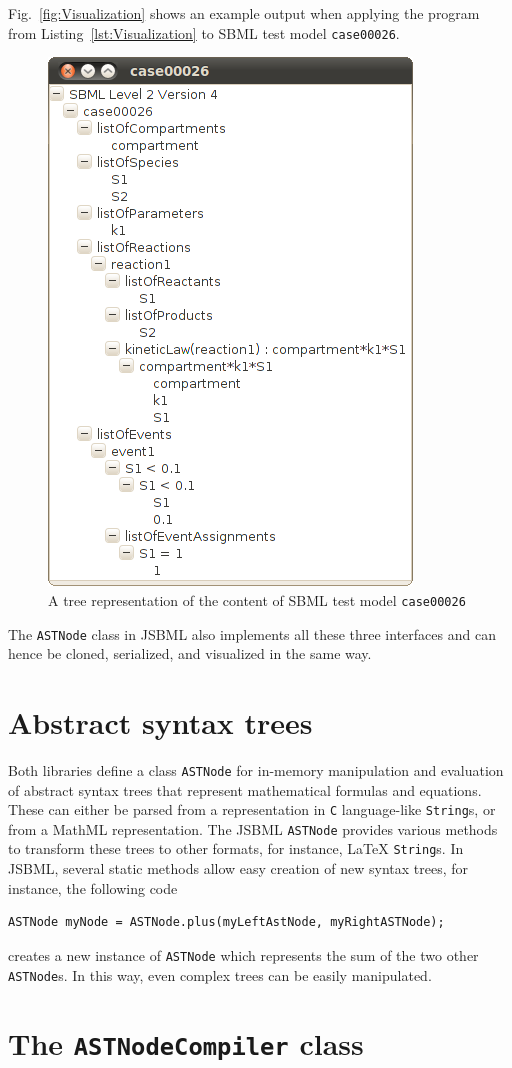 \documentclass[
  letterpaper,
  11pt,
  headsepline,
  pointlessnumbers,
  tablecaptionabove,
  headinclude,
  appendixprefix,
  idxtotoc,
  bibtotoc,
  titlepage
]{scrartcl}
\begin{document}
Fig.~\vref{fig:Visualization} shows an example output when applying the program from 
Listing~\vref{lst:Visualization} to SBML test model \texttt{case00026}.
\begin{figure}
\includegraphics[width=.35\textwidth]{posters/2010_ICSB_and_COMBINE/JSBMLvisualizerTransparent}
\caption[Tree representation of an SBML file]{A tree representation of the content of SBML test model \texttt{case00026}}
\label{fig:Visualization}
\end{figure}
The \verb!ASTNode! class in JSBML also implements all these three interfaces and can hence
be cloned, serialized, and visualized in the same way.


\section{Abstract syntax trees}

Both libraries define a class \verb!ASTNode! for in-memory manipulation and evaluation
of abstract syntax trees that represent mathematical formulas and equations. These
can either be parsed from a representation in \verb!C! language-like \verb!String!s,
or from a MathML representation. The JSBML \verb!ASTNode! provides various methods
to transform these trees to other formats, for instance, \LaTeX{} \verb!String!s.
In JSBML, several static methods allow easy creation of new syntax trees, for instance,
the following code
\begin{verbatim}
ASTNode myNode = ASTNode.plus(myLeftAstNode, myRightASTNode);
\end{verbatim}
creates a new instance of \verb!ASTNode! which represents the sum of the two other
\verb!ASTNode!s. In this way, even complex trees can be easily manipulated.

\section{The \texttt{ASTNodeCompiler} class}
\end{document}
